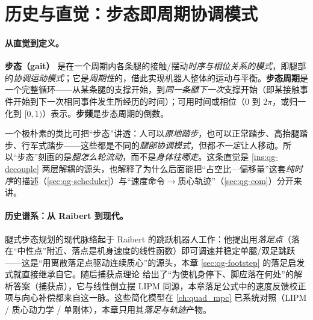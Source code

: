 \section{历史与直觉：步态即周期协调模式}
\label{sec:qg-history}

\paragraph{从直觉到定义。}
\textbf{步态（gait）} 是在一个周期内各条腿的接触/摆动\emph{时序与相位关系的模式}，即腿部的\emph{协调运动模式}；它是\emph{周期性}的，借此实现机器人整体的运动与平衡\cite{unitree2023quadruped}。\textbf{步态周期}是一个完整循环——从某条腿的支撑开始，到\emph{同一条腿下一次}支撑开始（即某接触事件开始到下一次相同事件发生所经历的时间）；可用时间或相位（$0$ 到 $2\pi$，或归一化到 $[0,1)$）表示。\textbf{步频}是步态周期的倒数。

\begin{insight}[踏步类比：步态≠移动]\label{ins:qg-treadmill}
一个极朴素的类比可把“步态”讲透：人可以\emph{原地踏步}，也可以正常踏步、高抬腿踏步、行军式踏步——这些都是不同的\emph{腿部协调模式}，但都\emph{不一定}让人移动。所以“步态”刻画的是\emph{腿怎么轮流动}，而不是\emph{身体往哪走}。这条直觉是 \cref{ins:qg-decouple} 两层解耦的源头，也解释了为什么后面能把“占空比—偏移量”这套\emph{纯时序}的描述（\cref{sec:qg-scheduler}）与“速度命令$\to$质心轨迹”（\cref{sec:qg-com}）分开来讲。
\end{insight}

\paragraph{历史谱系：从 Raibert 到现代。}
腿式步态规划的现代脉络起于 Raibert 的跳跃机器人工作\cite{raibert1986legged}：他提出用\emph{落足点}（落在“中性点”附近、落点是机身速度的线性函数）即可调速并稳定单腿/双足跳跃——这是“用离散落足点驱动连续质心”的源头，本章 \cref{sec:qg-footstep} 的落足启发式就直接继承自它。随后捕获点理论\cite{pratt2006capture} 给出了“为使机身停下、脚应落在何处”的解析答案（捕获点），它与线性倒立摆 LIPM\cite{kajita2001lipm} 同源，本章落足公式中的速度反馈校正项与向心补偿都来自这一脉。这些简化模型在 \cref{ch:quad_mpc} 已系统对照（LIPM / 质心动力学 / 单刚体），本章只用其\emph{落足与轨迹}产物。

